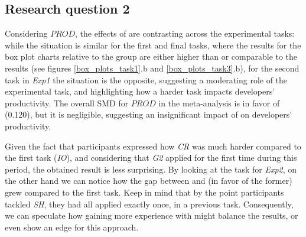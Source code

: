 \subsection{Research question 2}
Considering $PROD$, the effects of \tdd are contrasting across the experimental tasks: while the situation is similar for the first and final tasks, where the results for the box plot charts relative to the \tdd group are either higher than or comparable to the \notdd results (see figures \ref{box_plots_task1}.b and \ref{box_plots_task3}.b), for the second task in \textit{Exp1} the situation is the opposite, suggesting a moderating role of the experimental task, and highlighting how a harder task impacts developers' productivity.
The overall SMD for $PROD$ in the meta-analysis is in favor of \tdd (0.120), but it is negligible, suggesting an insignificant impact of \tdd on developers' productivity.

Given the fact that participants expressed how \textit{CR} was much harder compared to the first task (\ie \textit{IO}), and considering that \textit{G2} applied \tdd for the first time during this period, the obtained result is less surprising.
By looking at the task for \textit{Exp2}, on the other hand we can notice how the gap between \tdd and \notdd (in favor of the former) grew compared to the first task. Keep in mind that by the point participants tackled \textit{SH}, they had all applied \tdd exactly once, in a previous task. 
Consequently, we can speculate how gaining more experience with \tdd might balance the results, or even show an edge for this approach.



